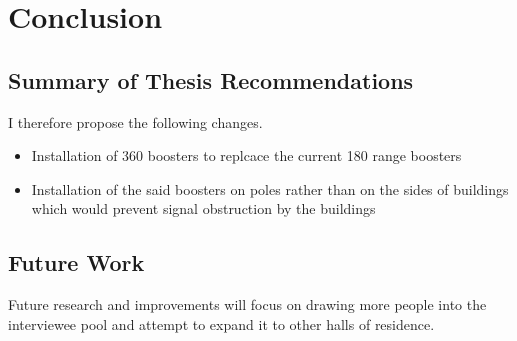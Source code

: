 
\chapter{Conclusion}

\label{ch:conclusions}

\section{Summary of Thesis Recommendations}

I therefore propose the following changes.
\begin{itemize}
    \item Installation of 360 boosters to replcace the current 180 range boosters
    \item Installation of the said boosters on poles rather than on the sides of buildings which would prevent signal obstruction by the buildings
\end{itemize}


\section{Future Work}

Future research and improvements will focus on drawing more people into the interviewee pool and attempt to expand it to other halls of residence.